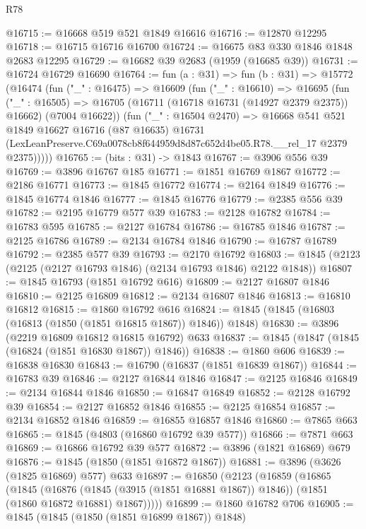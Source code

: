 \begin{lexlean}{R78}
\begin{coremodule}
@16715 := @16668 @519 @521 @1849 @16616
@16716 := @12870 @12295
@16718 := @16715 @16716 @16700
@16724 := @16675 @83 @330 @1846 @1848 @2683 @12295
@16729 := @16682 @39 @2683 (@1959 (@16685 @39))
@16731 := @16724 @16729 @16690
@16764 := fun (a : @31) =>
  fun (b : @31) =>
  @15772
    (@16474
      (fun ("_" : @16475) =>
      @16609
        (fun ("_" : @16610) =>
        @16695
          (fun ("_" : @16505) =>
          @16705 (@16711 (@16718 @16731 (@14927 @2379 @2375)) @16662) (@7004 @16622))
          (fun ("_" : @16504 @2470) =>
          @16668
            @541
            @521
            @1849
            @16627
            @16716
            (@87 @16635)
            @16731
            (LexLeanPreserve.C69a0078cb8f644959d8d87c652d4be05.R78.__rel_17 @2379 @2375)))))
@16765 := (bits : @31) -> @1843
@16767 := @3906 @556 @39
@16769 := @3896 @16767 @185
@16771 := @1851 @16769 @1867
@16772 := @2186 @16771
@16773 := @1845 @16772
@16774 := @2164 @1849
@16776 := @1845 @16774 @1846
@16777 := @1845 @16776
@16779 := @2385 @556 @39
@16782 := @2195 @16779 @577 @39
@16783 := @2128 @16782
@16784 := @16783 @595
@16785 := @2127 @16784
@16786 := @16785 @1846
@16787 := @2125 @16786
@16789 := @2134 @16784 @1846
@16790 := @16787 @16789
@16792 := @2385 @577 @39
@16793 := @2170 @16792
@16803 := @1845 (@2123 (@2125 (@2127 @16793 @1846) (@2134 @16793 @1846) @2122 @1848))
@16807 := @1845 @16793 (@1851 @16792 @616)
@16809 := @2127 @16807 @1846
@16810 := @2125 @16809
@16812 := @2134 @16807 @1846
@16813 := @16810 @16812
@16815 := @1860 @16792 @616
@16824 := @1845 (@1845 (@16803 (@16813 (@1850 (@1851 @16815 @1867)) @1846)) @1848)
@16830 := @3896 (@2219 @16809 @16812 @16815 @16792) @633
@16837 := @1845 (@1847 (@1845 (@16824 (@1851 @16830 @1867)) @1846))
@16838 := @1860 @606
@16839 := @16838 @16830
@16843 := @16790 (@16837 (@1851 @16839 @1867))
@16844 := @16783 @39
@16846 := @2127 @16844 @1846
@16847 := @2125 @16846
@16849 := @2134 @16844 @1846
@16850 := @16847 @16849
@16852 := @2128 @16792 @39
@16854 := @2127 @16852 @1846
@16855 := @2125 @16854
@16857 := @2134 @16852 @1846
@16859 := @16855 @16857 @1846
@16860 := @7865 @663
@16865 := @1845 (@4803 (@16860 @16792 @39 @577))
@16866 := @7871 @663
@16869 := @16866 @16792 @39 @577
@16872 := @3896 (@1821 @16869) @679
@16876 := @1845 (@1850 (@1851 @16872 @1867))
@16881 := @3896 (@3626 (@1825 @16869) @577) @633
@16897 := @16850
    (@2123
      (@16859
        (@16865
          (@1845
            (@16876 (@1845 (@3915 (@1851 @16881 @1867)) @1846))
            (@1851 (@1860 @16872 @16881) @1867)))))
@16899 := @1860 @16782 @706
@16905 := @1845 (@1845 (@1850 (@1851 @16899 @1867)) @1848)

\end{coremodule}
\end{lexlean}
